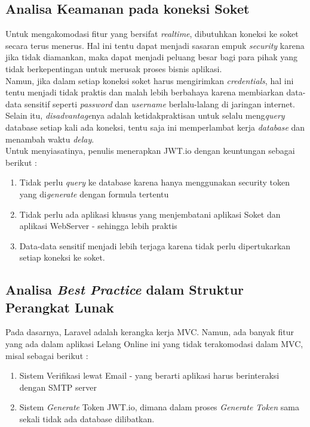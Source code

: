     \subsection{Analisa Keamanan pada koneksi Soket}
    \label{alasan-socket.io}
    Untuk mengakomodasi fitur yang bersifat \textit{realtime}, dibutuhkan koneksi ke soket secara terus menerus. Hal ini tentu dapat menjadi sasaran empuk \textit{security} karena jika tidak diamankan, maka dapat menjadi peluang besar bagi para pihak yang tidak berkepentingan untuk merusak proses bisnis aplikasi.\\
    \indent Namun, jika dalam setiap koneksi soket harus mengirimkan \textit{credentials}, hal ini tentu menjadi tidak praktis dan malah lebih berbahaya karena membiarkan data-data sensitif seperti \textit{password} dan \textit{username} berlalu-lalang di jaringan internet. Selain itu, \textit{disadvantage}nya adalah ketidakpraktisan untuk selalu meng\textit{query} database setiap kali ada koneksi, tentu saja ini memperlambat kerja \textit{database} dan menambah waktu \textit{delay}.\\
    \indent Untuk menyiasatinya, penulis menerapkan JWT.io dengan keuntungan sebagai berikut :
    \begin{enumerate}
    \item Tidak perlu \textit{query} ke database karena hanya menggunakan security token yang di\textit{generate} dengan formula tertentu
    \item Tidak perlu ada aplikasi khusus yang menjembatani aplikasi Soket dan aplikasi WebServer - sehingga lebih praktis
    \item Data-data sensitif menjadi lebih terjaga karena tidak perlu dipertukarkan setiap koneksi ke soket.
    \end{enumerate}
    
    \subsection{Analisa \textit{Best Practice} dalam Struktur Perangkat Lunak}
    \label{alasan-best-practice}
    Pada dasarnya, Laravel adalah kerangka kerja MVC. Namun, ada banyak fitur yang ada dalam aplikasi Lelang Online ini yang tidak terakomodasi dalam MVC, misal sebagai berikut :
    \begin{enumerate}
    \item Sistem Verifikasi lewat Email - yang berarti aplikasi harus berinteraksi dengan SMTP server
    \item Sistem \textit{Generate} Token JWT.io, dimana dalam proses \textit{Generate Token} sama sekali tidak ada database dilibatkan.
    \end{enumerate}
    
